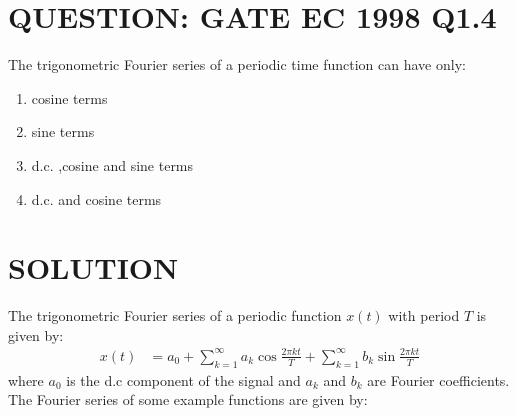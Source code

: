 \documentclass[journal,12pt,twocolumn]{IEEEtran}
\begin{document}
\section{QUESTION: GATE EC 1998 Q1.4}
The trigonometric Fourier series of a periodic time function can have only:
\begin{enumerate}[label=(\Alph*)]
\item cosine terms 
\item sine terms
\item d.c. ,cosine and sine terms
\item d.c. and cosine terms 
\end{enumerate}
\section{SOLUTION}
The trigonometric Fourier series of a periodic function $x(t)$ with period $T$ is given by:
\begin{align}
x(t) &= a_{0} + \sum_{k=1}^{\infty}a_{k}\cos{\frac{2\pi kt}{T}} +\sum_{k=1}^{\infty}b_{k}\sin{\frac{2\pi kt}{T}}
\end{align}
where $a_{0}$ is the d.c component of the signal and $a_{k}$ and $b_{k}$ are Fourier coefficients. The Fourier series of some example functions are given by:
\end{document}
